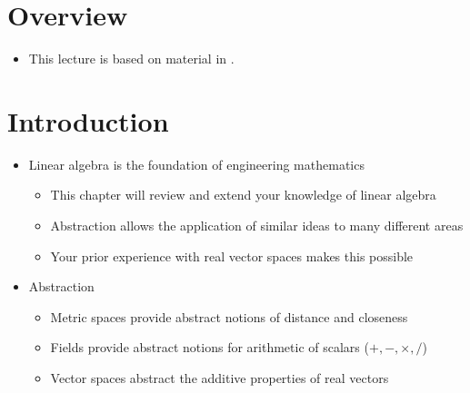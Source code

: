 \documentclass[11pt,twoside]{report}
\begin{document}



\section*{Overview} 

\begin{itemize}


\item This lecture is based on material in  \cite[Chapters~3 and 6]{chamberland:2023EF}.


\end{itemize}

\section{Introduction} 


\begin{itemize}
\item Linear algebra is the foundation of engineering mathematics 
  \begin{itemize}
  \item This chapter will review and extend your knowledge of linear algebra
  \item Abstraction allows the application of similar ideas to many different areas
  \item Your prior experience with real vector spaces makes this possible 
  \end{itemize}
\item Abstraction 
  \begin{itemize}
  \item Metric spaces provide abstract notions of distance and closeness
  \item Fields provide abstract notions for arithmetic of scalars ($+,-,\times,/$)
  \item Vector spaces abstract the additive properties of real vectors
  \end{itemize}
  \end{itemize}
  
\end{document}
